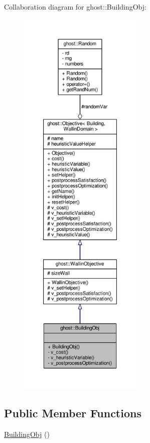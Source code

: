 Collaboration diagram for ghost\-:\-:Building\-Obj\-:
\nopagebreak
\begin{figure}[H]
\begin{center}
\leavevmode
\includegraphics[height=550pt]{classghost_1_1BuildingObj__coll__graph}
\end{center}
\end{figure}
\subsection*{Public Member Functions}
\begin{DoxyCompactItemize}
\item 
\hyperlink{classghost_1_1BuildingObj_af478d2e0b3cb57d439108806ac746fab}{Building\-Obj} ()
\end{DoxyCompactItemize}
